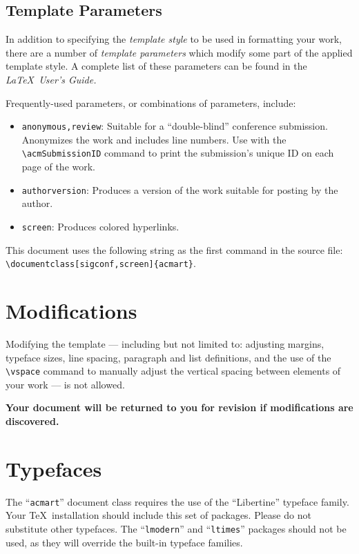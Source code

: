 \documentclass[sigplan,screen,anonymous]{acmart}
\begin{document}
\subsection{Template Parameters}

In addition to specifying the {\it template style} to be used in formatting your work, there are a number of {\it template parameters} which modify some part of the applied template style. A complete list of these parameters can be found in the {\it \LaTeX\ User's Guide.}

Frequently-used parameters, or combinations of parameters, include:
\begin{itemize}
\item {\verb|anonymous,review|}: Suitable for a ``double-blind'' conference submission. Anonymizes the work and includes line numbers. Use with the \verb|\acmSubmissionID| command to print the submission's unique ID on each page of the work.
\item{\verb|authorversion|}: Produces a version of the work suitable for posting by the author.
\item{\verb|screen|}: Produces colored hyperlinks.
\end{itemize}

This document uses the following string as the first command in the source file: \verb|\documentclass[sigconf,screen]{acmart}|.

\section{Modifications}

Modifying the template --- including but not limited to: adjusting margins, typeface sizes, line spacing, paragraph and list definitions, and the use of the \verb|\vspace| command to manually adjust the vertical spacing between elements of your work --- is not allowed.

{\bf Your document will be returned to you for revision if modifications are discovered.}

\section{Typefaces}

The ``\verb|acmart|'' document class requires the use of the ``Libertine'' typeface family. Your \TeX\ installation should include this set of packages. Please do not substitute other typefaces. The ``\verb|lmodern|'' and ``\verb|ltimes|'' packages should not be used, as they will override the built-in typeface families.
\end{document}
